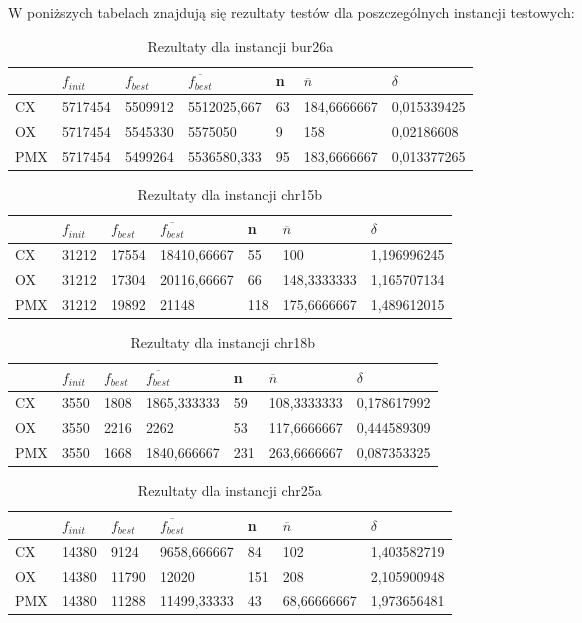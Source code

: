 W poniższych tabelach znajdują się rezultaty testów dla poszczególnych instancji testowych:

\begin{table}[H]
\label{T2_bur26a}
\begin{tabular}{l l l l l l l}
\hline
 & $f_{init}$ & $f_{best}$ & $\overline{f_{best}}$ & n & $\overline{n}$ & $\delta$ \\
\hline
CX & 5717454 & 5509912 & 5512025,667 & 63 & 184,6666667 & 0,015339425\\
OX & 5717454 & 5545330 & 5575050 & 9 & 158 & 0,02186608\\
PMX	& 5717454 & 5499264 & 5536580,333 & 95 & 183,6666667 & 0,013377265\\
\hline
\end{tabular}
\caption{Rezultaty dla instancji bur26a}
\end{table}

\begin{table}[H]
\label{T2_chr15b}
\begin{tabular}{l l l l l l l}
\hline
 & $f_{init}$ & $f_{best}$ & $\overline{f_{best}}$ & n & $\overline{n}$ & $\delta$ \\
\hline
CX & 31212 & 17554 & 18410,66667 & 55 & 100 & 1,196996245\\
OX & 31212 & 17304 & 20116,66667 & 66 & 148,3333333 & 1,165707134\\
PMX & 31212 & 19892 & 21148 & 118 & 175,6666667 & 1,489612015\\
\hline
\end{tabular}
\caption{Rezultaty dla instancji chr15b}
\end{table}

\begin{table}[H]
\label{T2_chr18b}
\begin{tabular}{l l l l l l l}
\hline
 & $f_{init}$ & $f_{best}$ & $\overline{f_{best}}$ & n & $\overline{n}$ & $\delta$ \\
\hline
CX & 3550 & 1808 & 1865,333333 & 59 & 108,3333333 & 0,178617992\\
OX & 3550 & 2216 & 2262 & 53 & 117,6666667 & 0,444589309\\
PMX & 3550 & 1668 & 1840,666667 & 231 & 263,6666667 & 0,087353325\\
\hline
\end{tabular}
\caption{Rezultaty dla instancji chr18b}
\end{table}

\begin{table}[H]
\label{T2_chr25a}
\begin{tabular}{l l l l l l l}
\hline
 & $f_{init}$ & $f_{best}$ & $\overline{f_{best}}$ & n & $\overline{n}$ & $\delta$ \\
\hline
CX & 14380 & 9124 & 9658,666667 & 84 & 102 & 1,403582719\\
OX & 14380 & 11790 & 12020 & 151 & 208 & 2,105900948\\
PMX & 14380 & 11288 & 11499,33333 & 43 & 68,66666667 & 1,973656481\\
\hline
\end{tabular}
\caption{Rezultaty dla instancji chr25a}
\end{table}

